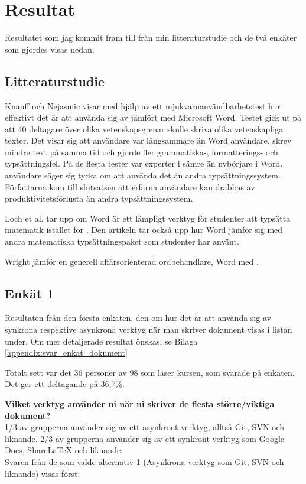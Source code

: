 \section{Resultat}
\label{sec:results-tuhkala}
Resultatet som jag kommit fram till från min litteraturstudie och de två enkäter som gjordes visas nedan.

\subsection{Litteraturstudie}
Knauff och Nejasmic \cite{knauff2014efficiency} visar med hjälp av ett mjukvaruanvändbarhetstest hur effektivt det är att använda sig av \latex jämfört med Microsoft Word. Testet gick ut på att 40 deltagare över olika vetenskapsgrenar skulle skriva olika vetenskapliga texter.
Det visar sig att \latex användare var långsammare än Word användare, skrev mindre text på samma tid och gjorde fler grammatiska-, formatterings- och typsättningsfel. På de flesta tester var experter i \latex sämre än nybörjare i Word. \latex användare säger sig tycka om att använda det än andra typsättningssystem. Författarna kom till slutsatsen att erfarna \latex användare kan drabbas av produktivitetsförlusta än andra typsättningssystem.

Loch et al. \cite{loch2014master} tar upp om Word är ett lämpligt verktyg för studenter att typsätta matematik istället för \latex. Den artikeln tar också upp hur Word jämför sig med andra matematiska typsättningspaket som studenter har använt. 

Wright \cite{wright2010technical} jämför en generell affärsorienterad ordbehandlare, Word med \latex.  


\subsection{Enkät 1}
Resultaten från den första enkäten, den om hur det är att använda sig av synkrona respektive asynkrona verktyg när man skriver dokument visas i listan under. Om mer detaljerade resultat önskas, se Bilaga \ref{appendix:svar_enkat_dokument}

Totalt sett var det 36 personer av 98 som läser kursen, som svarade på enkäten. Det ger ett deltagande på 36,7\%.

\textbf{Vilket verktyg använder ni när ni skriver de flesta större/viktiga dokument?}
\\1/3 av grupperna använder sig av ett asynkront verktyg, alltså Git, SVN och liknande. 2/3 av grupperna använder sig av ett synkront verktyg som Google Docs, ShareLaTeX och liknande.
\\Svaren från de som valde alternativ 1 (Asynkrona verktyg som Git, SVN och liknande) visas först:

